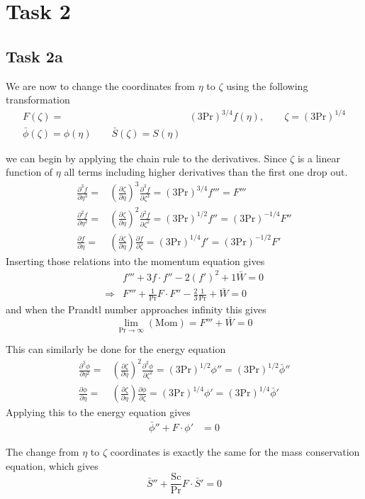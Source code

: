 \section*{Task 2} %
\label{sec:Task 2}
	\subsection*{Task 2a}
	We are now to change the coordinates from $\eta$ to $\zeta$ using the following transformation
	\begin{align*}
	  F(\zeta) =& (3\text{Pr})^{3/4} f(\eta), \qquad \zeta = (3 \text{Pr})^{1/4} \\
	  \bar{\phi}(\zeta) = \phi (\eta) \qquad \bar{S}(\zeta) = S(\eta )
	\end{align*}

	we can begin by applying the chain rule to the derivatives. Since $\zeta$ is a linear function of $\eta$ all terms including higher derivatives than the first one drop out.
	\begin{align*}
	  \frac{\partial^3 f}{\partial \eta^3}=& \left( \frac{\partial \zeta}{\partial \eta} \right)^3 \frac{\partial^3 f}{\partial \zeta^3}=(3 \text{Pr})^{3/4}f'''=F'''\\
	  \frac{\partial^2 f}{\partial \eta^2}=& \left( \frac{\partial \zeta}{\partial \eta} \right)^2 \frac{\partial^2 f}{\partial \zeta^2}=(3 \text{Pr})^{1/2}f''=(3 \text{Pr})^{-1/4} F''\\
	  \frac{\partial f}{\partial \eta}=& \left( \frac{\partial \zeta}{\partial \eta} \right) \frac{\partial f}{\partial \zeta}=(3 \text{Pr})^{1/4}f'=(3 \text{Pr})^{-1/2}F'
	\end{align*}
	Inserting those relations into the momentum equation gives
	\begin{align*}
	  &f'''+3f\cdot f'' -2(f')^2 + 1 \bar{W} = 0 \\
	  \Rightarrow& F''' +\frac{1}{\text{Pr}}F\cdot F'' -\frac{2}{3}\frac{1}{\text{Pr}}+\bar{W}=0 
	\end{align*}
	and when the Prandtl number approaches infinity this gives
	\begin{equation*}
	  \lim_{\text{Pr}\rightarrow \infty} (\text{Mom}) = F'''+\bar{W} =0
	\end{equation*}

	This can similarly be done for the energy equation
	\begin{align*}
	  \frac{\partial^2 \phi}{\partial \eta^2}=& \left( \frac{\partial \zeta}{\partial \eta} \right)^2 \frac{\partial^2 \phi}{\partial \zeta^2}=(3 \text{Pr})^{1/2}\phi'' =(3 \text{Pr})^{1/2}\bar{\phi}'' \\
	  \frac{\partial \phi}{\partial \eta}=& \left( \frac{\partial \zeta}{\partial \eta} \right) \frac{\partial \phi}{\partial \zeta}=(3 \text{Pr})^{1/4}\phi' =(3 \text{Pr})^{1/4}\bar{\phi}' 
	\end{align*}
	Applying this to the energy equation gives
	\begin{align*}
	  \bar{\phi}''+F\cdot\phi'&=0
	\end{align*}

	The change from $\eta$ to $\zeta$ coordinates is exactly the same for the mass conservation equation, which gives
	\begin{equation*}
	  \bar{S}''+\frac{\text{Sc}}{\text{Pr}}F\cdot \bar{S}'=0
	\end{equation*}

	


